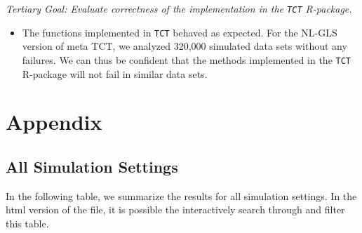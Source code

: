 \documentclass[
]{article}
\providecommand{\tightlist}{%
  \setlength{\itemsep}{0pt}\setlength{\parskip}{0pt}}
\begin{document}
\emph{Tertiary Goal: Evaluate correctness of the implementation in the \texttt{TCT}
R-package.}

\begin{itemize}
\tightlist
\item
  The functions implemented in \texttt{TCT} behaved as expected. For the NL-GLS version
  of meta TCT, we analyzed 320,000 simulated data sets without any failures. We can thus be confident that the methods implemented in the \texttt{TCT} R-package will not fail
  in similar data sets.
\end{itemize}

\hypertarget{appendix}{%
\section{Appendix}\label{appendix}}

\hypertarget{all-simulation-settings}{%
\subsection{All Simulation Settings}\label{all-simulation-settings}}

In the following table, we summarize the results for all simulation settings. In
the html version of the file, it is possible the interactively search through and
filter this table.
\end{document}
